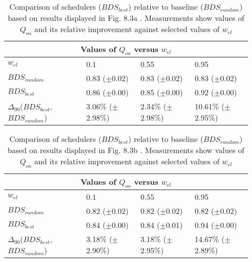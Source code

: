 \clearpage
\begin{landscape}
\begin{table}[h]
\begin{center}
\begin{tabular}{llll}
\toprule
\multicolumn{4}{c}{Values of $Q_{oa}$ versus $w_{el}$}\\
\midrule
$w_{el}$ & 0.1 & 0.55 & 0.95\\
\midrule
$BDS_{random}$ &  0.83 ($\pm$0.02) &  0.83 ($\pm$0.02) &  0.83 ($\pm$0.02)\\
\midrule
$BDS_{best}$ &  0.86 ($\pm$0.00) &  0.85 ($\pm$0.00) &  0.92 ($\pm$0.00)\\
$\Delta_{90}$($BDS_{best}$,$BDS_{random}$) & 3.06\% ($\pm$2.98\%) & 2.34\% ($\pm$2.98\%) & 10.61\% ($\pm$2.95\%)\\
\bottomrule
\end{tabular}
\end{center}
\caption[Comparison of $Q_{oa}$ versus $w_{el}$ for $BDS_{best}$ relative to $BDS_{random}$.]{Comparison of schedulers ($BDS_{best}$) relative to baseline ($BDS_{random}$) based on results displayed in Fig. 8.3a . Measurements show values of $Q_{oa}$ and its relative improvement against selected values of $w_{el}$}
\label{b:f83a}
\end{table}
\end{landscape}


\clearpage
\begin{landscape}
\begin{table}[h]
\begin{center}
\begin{tabular}{llll}
\toprule
\multicolumn{4}{c}{Values of $Q_{oa}$ versus $w_{el}$}\\
\midrule
$w_{el}$ & 0.1 & 0.55 & 0.95\\
\midrule
$BDS_{random}$ &  0.82 ($\pm$0.02) &  0.82 ($\pm$0.02) &  0.82 ($\pm$0.02)\\
\midrule
$BDS_{best}$ &  0.84 ($\pm$0.00) &  0.84 ($\pm$0.01) &  0.94 ($\pm$0.00)\\
$\Delta_{90}$($BDS_{best}$,$BDS_{random}$) & 3.18\% ($\pm$2.90\%) & 3.18\% ($\pm$2.95\%) & 14.67\% ($\pm$2.89\%)\\
\bottomrule
\end{tabular}
\end{center}
\caption[Comparison of $Q_{oa}$ versus $w_{el}$ for $BDS_{best}$ relative to $BDS_{random}$.]{Comparison of schedulers ($BDS_{best}$) relative to baseline ($BDS_{random}$) based on results displayed in Fig. 8.3b . Measurements show values of $Q_{oa}$ and its relative improvement against selected values of $w_{el}$}
\label{b:f83b}
\end{table}
\end{landscape}


